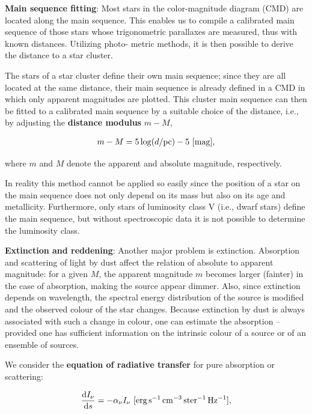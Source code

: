 \documentclass[a4paper,10pt]{article}
\begin{document}
{\noindent}\textbf{Main sequence fitting}: Most stars in the color-magnitude diagram (CMD) are located along the main sequence. This enables us to compile a calibrated main sequence of those stars whose trigonometric parallaxes are measured, thus with known distances. Utilizing photo- metric methods, it is then possible to derive the distance to a star cluster. 

{\noindent}The stars of a star cluster define their own main sequence; since they are all located at the same distance, their main sequence is already defined in a CMD in which only apparent magnitudes are plotted. This cluster main sequence can then be fitted to a calibrated main sequence by a suitable choice of the distance, i.e., by adjusting the \textbf{distance modulus} $m-M$,

\begin{align*}
    m-M = 5\log(d/{\rm pc}) - 5 ~ [{\rm mag}],
\end{align*}

{\noindent}where $m$ and $M$ denote the apparent and absolute magnitude, respectively.

{\noindent}In reality this method cannot be applied so easily since the position of a star on the main sequence does not only depend on its mass but also on its age and metallicity. Furthermore, only stars of luminosity class V (i.e., dwarf stars) define the main sequence, but without spectroscopic data it is not possible to determine the luminosity class.

{\noindent}\textbf{Extinction and reddening}: Another major problem is extinction. Absorption and scattering of light by dust affect the relation of absolute to apparent magnitude: for a given $M$, the apparent magnitude $m$ becomes larger (fainter) in the case of absorption, making the source appear dimmer. Also, since extinction depends on wavelength, the spectral energy distribution of the source is modified and the observed colour of the star changes. Because extinction by dust is always associated with such a change in colour, one can estimate the absorption -- provided one has sufficient information on the intrinsic colour of a source or of an ensemble of sources.

{\noindent}We consider the \textbf{equation of radiative transfer} for pure absorption or scattering:

\begin{align*}
    \frac{\mathrm{d}I_\nu}{\mathrm{d}s} = -\alpha_\nu I_\nu ~ [\rm erg\,s^{-1}\,cm^{-3}\,ster^{-1}\,Hz^{-1}],
\end{align*}
\end{document}
